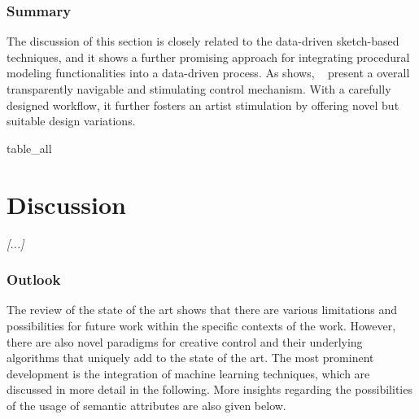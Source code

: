 

\subsubsection{Summary}
\label{subsec:analysis_elementplacement}

The discussion of this section is closely related to the data-driven sketch-based techniques, and it shows a further promising approach for integrating procedural modeling functionalities into a data-driven process. As  shows, \citeauthor*{guerrero_2016_pep}~\cite{guerrero_2016_pep} present a overall transparently navigable and stimulating control mechanism. With a carefully designed workflow, it further fosters an artist stimulation by offering novel but suitable design variations.


{table_all}




\section{Discussion}
\label{subsec:analysis_discussion}


\textit{[...]}

\subsubsection{Outlook}
\label{subsec:analysis_outlook}

The review of the state of the art shows that there are various limitations and possibilities for future work within the specific contexts of the work. However, there are also novel paradigms for creative control and their underlying algorithms that uniquely add to the state of the art. The most prominent development is the integration of machine learning techniques, which are discussed in more detail in the following. More insights regarding the possibilities of the usage of semantic attributes are also given below.

